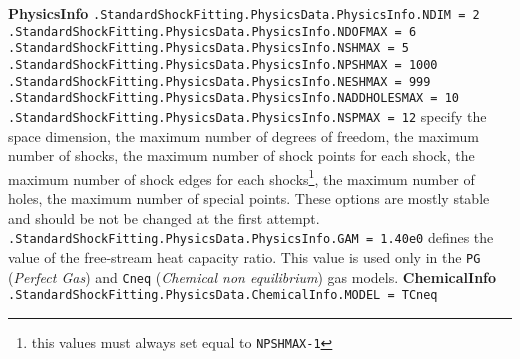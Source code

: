 \documentclass[11pt,a4paper,oneside]{article}
\begin{document}
\textbf{PhysicsInfo}
\newline
\newline
\hspace*{1cm} \texttt{.StandardShockFitting.PhysicsData.PhysicsInfo.NDIM = 2}
\newline
\hspace*{1cm} \texttt{.StandardShockFitting.PhysicsData.PhysicsInfo.NDOFMAX = 6}
\newline
\hspace*{1cm} \texttt{.StandardShockFitting.PhysicsData.PhysicsInfo.NSHMAX = 5}
\newline
\hspace*{1cm} \texttt{.StandardShockFitting.PhysicsData.PhysicsInfo.NPSHMAX = 1000}
\newline
\hspace*{1cm} \texttt{.StandardShockFitting.PhysicsData.PhysicsInfo.NESHMAX = 999}
\newline
\hspace*{1cm} \texttt{.StandardShockFitting.PhysicsData.PhysicsInfo.NADDHOLESMAX = 10}
\newline
\hspace*{1cm} \texttt{.StandardShockFitting.PhysicsData.PhysicsInfo.NSPMAX = 12}
\newline
\newline
specify the space dimension, the maximum number of degrees of freedom, the maximum number of shocks, the maximum number of shock points for each shock, the maximum number of shock edges for each shocks\footnote{this values must always set equal to \texttt{NPSHMAX-1}}, the maximum number of holes, the maximum number of special points.
\newline
These options are mostly stable and should be not be changed at the first attempt.
\newline
\newline
\hspace*{1cm} \texttt{.StandardShockFitting.PhysicsData.PhysicsInfo.GAM = 1.40e0}
\newline
\newline
defines the value of the free-stream heat capacity ratio. This value is used only in the \texttt{PG} (\textit{Perfect Gas}) and \texttt{Cneq} (\textit{Chemical non equilibrium}) gas models.
\newline
\newline
\textbf{ChemicalInfo}
\newline
\newline
\hspace*{1cm} \texttt{.StandardShockFitting.PhysicsData.ChemicalInfo.MODEL = TCneq}
\end{document}
